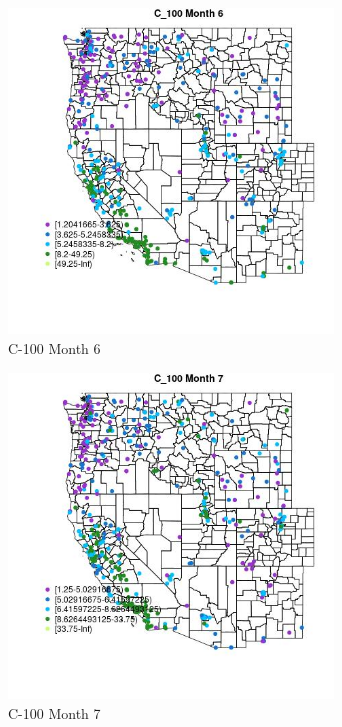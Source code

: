 \clearpage 

\begin{figure} 
\centering  
\includegraphics[width=0.77\textwidth]{Code_Outputs/ML_input_report_ML_input_PM25_Step5_part_d_de_duplicated_aves_ML_input_MapObsMo6C_100.jpg} 
\caption{\label{fig:ML_input_report_ML_input_PM25_Step5_part_d_de_duplicated_aves_ML_inputMapObsMo6C_100}C-100 Month 6} 
\end{figure} 
 

\begin{figure} 
\centering  
\includegraphics[width=0.77\textwidth]{Code_Outputs/ML_input_report_ML_input_PM25_Step5_part_d_de_duplicated_aves_ML_input_MapObsMo7C_100.jpg} 
\caption{\label{fig:ML_input_report_ML_input_PM25_Step5_part_d_de_duplicated_aves_ML_inputMapObsMo7C_100}C-100 Month 7} 
\end{figure} 
 

